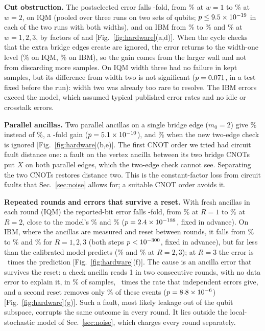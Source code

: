 \documentclass[10pt,a4paper,twocolumn]{article}
\begin{document}
\textbf{Cut obstruction.}  The postselected error falls \hwIQMfold-fold, from
\hwIQMwOne\% at $w=1$ to \hwIQMwTwo\% at $w=2$, on IQM (pooled over three runs on
two sets of qubits; $p\le9.5\times10^{-19}$ in each of the two runs with both
widths), and on IBM from \hwIBMwOne\% to \hwIBMwTwo\% and \hwIBMwThree\% at
$w=1,2,3$, by factors of \hwIBMfoldOneTwo{} and \hwIBMfoldTwoThree{}
[Fig.~\ref{fig:hardware}(a,d)].  When the cycle checks that the extra bridge
edges create are ignored, the error returns to the width-one level (\hwIQMctrl\%
on IQM, \hwIBMctrl\% on IBM), so the gain comes from the larger wall and not from
discarding more samples.  On IQM width three had no failure in
\hwIQMwThreeKept{} kept samples, but its difference from width two is not
significant ($p=0.071$, in a test fixed before the run): width two was
already too rare to resolve.  The IBM errors exceed the model, which assumed
typical published error rates and no idle or crosstalk errors.

\textbf{Parallel ancillas.}  Two parallel ancillas on a single bridge edge
($m_0=2$) give \hwMult\% instead of \hwIQMwOne\%, a \hwMultFold-fold gain
($p=5.1\times10^{-10}$), and \hwMultCtrl\% when the new two-edge check is ignored
[Fig.~\ref{fig:hardware}(b,e)].  The first CNOT order we tried had circuit fault
distance one: a fault on the vertex ancilla between its two bridge CNOTs put $X$
on both parallel edges, which the two-edge check cannot see.  Separating the two
CNOTs restores distance two.  This is the constant-factor loss from circuit
faults that Sec.~\ref{sec:noise} allows for; a suitable CNOT order avoids it.

\textbf{Repeated rounds and errors that survive a reset.}  With fresh ancillas
in each round (IQM) the reported-bit error falls \hwRndIQMfold-fold, from
\hwRndIQMOne\% at $R=1$ to \hwRndIQMTwo\% at $R=2$, close to the model's
\hwRndIQMModelOne\% and \hwRndIQMModelTwo\% ($p=2.4\times10^{-188}$, fixed in advance).
On IBM, where the ancillas are measured and reset between rounds, it falls from
\hwRndIBMOne\% to \hwRndIBMTwo\% and \hwRndIBMThree\% for $R=1,2,3$ (both steps
$p<10^{-300}$, fixed in advance), but far less than the calibrated model
predicts (\hwRndIBMModelTwo\% and \hwRndIBMModelThree\% at $R=2,3$); at $R=3$
the error is \hwRndIBMModelRatio~times the prediction
[Fig.~\ref{fig:hardware}(f)].  The cause is an ancilla error that survives the
reset: a check ancilla reads 1 in two consecutive rounds, with no data error to
explain it, in \hwPersSingle\% of samples, \hwPersRatio~times the rate that
independent errors give, and a second reset removes only \hwPersRel\% of these
events ($p=8.8\times10^{-6}$) [Fig.~\ref{fig:hardware}(g)].  Such a fault, most likely
leakage out of the qubit subspace, corrupts the same outcome in every round.  It
lies outside the local-stochastic model of Sec.~\ref{sec:noise}, which charges
every round separately.
\end{document}
